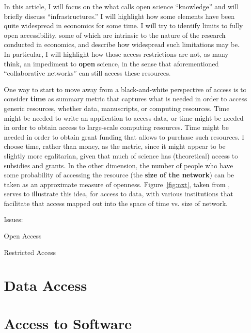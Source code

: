 \documentclass{article}
\begin{document}
In this article, I will focus on the what \cite{unesco_understanding_2022} calls open science ``knowledge'' and will briefly discuss ``infrastructures.'' I will highlight how some elements have been quite widespread in economics for some time. I will try to identify limits to fully open accessibility, some of which are intrinsic to the nature of the research conducted in economics, and describe how widespread such limitations may be. In particular, I will highlight how those access restrictions are not, as many think, an impediment to \textbf{open} science, in the sense that aforementioned ``collaborative networks'' can still access these resources. 

One way to start to move away from a black-and-white perspective of access is to consider \textbf{time} as summary metric that captures what is needed in order to access generic resources, whether data, manuscripts, or computing resources. Time might be needed to write an application to access data, or time might be needed in order to obtain access to large-scale computing resources. Time might be needed in order to obtain grant funding that allows to purchase such resources. I choose time, rather than money, as the metric, since it might appear to be slightly more egalitarian, given that much of science has (theoretical) access to subsidies and grants. In the other dimension,  the number of people who have some probability of accessing the resource (the \textbf{size of the network}) can be taken as an approximate measure of openness. Figure~\ref{fig:nxt}, taken from \citep{vilhuber_reproducibility_2023}, serves to illustrate this idea, for access to data, with various institutions that facilitate that access mapped out into the space of time vs. size of network. 








Issues:

Open Access

Restricted Access


\section{Data Access}
\label{sec:data_access}


\section{Access to Software}
\label{sec:software}
\end{document}
